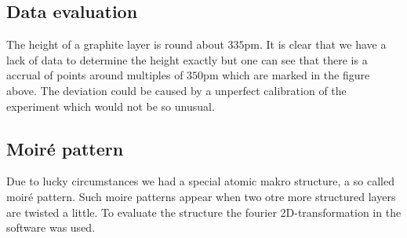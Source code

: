 \documentclass[a4paper, parskip=half]{scrartcl}
\begin{document}
\begin{center}
\begin{tabular}{>{\centering\arraybackslash}m{2in} >{\centering\arraybackslash}m{2in} >{\centering\arraybackslash}m{1in}}
\end{tabular}
\end{center}
\newpage
\subsection{Data evaluation}
The height of a graphite layer is round about $335 \text{pm}$. It is clear that we have a lack of data to determine the height exactly but one can see that there is a accrual of points around multiples of $350 \text{pm}$ which are marked in the figure above. The deviation could be caused by a unperfect calibration of the experiment which would not be so unusual.

\subsection{Moiré pattern}
Due to lucky circumstances we had a special atomic makro structure, a so called moiré pattern. Such moire patterns appear when two otre more structured layers are twisted a little. To evaluate the structure the fourier 2D-transformation in the software was used.
\end{document}
